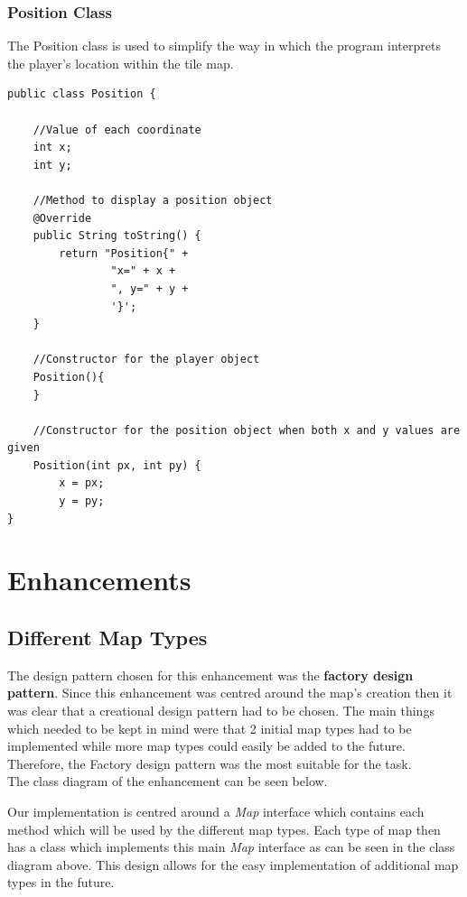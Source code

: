 \documentclass[a4paper,12pt]{extarticle}
\begin{document}
\subsubsection{Position Class}

The Position class is used to simplify the way in which the program interprets the player's location within the tile map.

\begin{lstlisting}[caption=The initial code of the Position class]
public class Position {

    //Value of each coordinate
    int x;
    int y;

    //Method to display a position object
    @Override
    public String toString() {
        return "Position{" +
                "x=" + x +
                ", y=" + y +
                '}';
    }

    //Constructor for the player object
    Position(){
    }

    //Constructor for the position object when both x and y values are given
    Position(int px, int py) {
        x = px;
        y = py;
}
\end{lstlisting}

\newpage
\section{Enhancements}
\subsection{Different Map Types}

The design pattern chosen for this enhancement was the \textbf{factory design pattern}. Since this enhancement was centred around the map's creation then it was clear that a creational design pattern had to be chosen. The main things which needed to be kept in mind were that 2 initial map types had to be implemented while more map types could easily be added to the future. Therefore, the Factory design pattern was the most suitable for the task.\\

The class diagram of the enhancement can be seen below.\\

\newpage

\noindent Our implementation is centred around a \textit{Map} interface which contains each method which will be used by the different map types. Each type of map then has a class which implements this main \textit{Map} interface as can be seen in the class diagram above. This design allows for the easy implementation of additional map types in the future.\par
\end{document}
